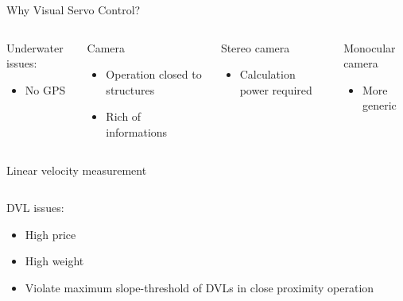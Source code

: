 \documentclass{beamer}
\begin{document}
\begin{frame}{Why Visual Servo Control?}




	\begin{columns}[t]
		\begin{exampleblock}{Underwater issues:}		
			\begin{itemize}
				\item No GPS 
			\end{itemize}
		\end{exampleblock}
		\begin{exampleblock}{Camera}		
			\begin{itemize}
				\item Operation closed to structures
				\item Rich of informations
			\end{itemize}
		\end{exampleblock}
	
		
		\begin{exampleblock}{Stereo camera}
			\begin{itemize}
				\item Calculation power required
			\end{itemize}
		\end{exampleblock}
		\begin{exampleblock}{Monocular camera}
			\begin{itemize}
				\item More generic
			\end{itemize}
		\end{exampleblock}
	\end{columns}

\end{frame}

\begin{frame}{Linear velocity measurement}
	\begin{columns}[t]
		\begin{exampleblock}{DVL issues:}
			\begin{itemize}
				\item High price
				\item High weight
				\item Violate maximum slope-threshold of DVLs in close proximity operation
			\end{itemize}
		\end{exampleblock}
		
		
	\end{columns} 
\end{frame}
\end{document}
